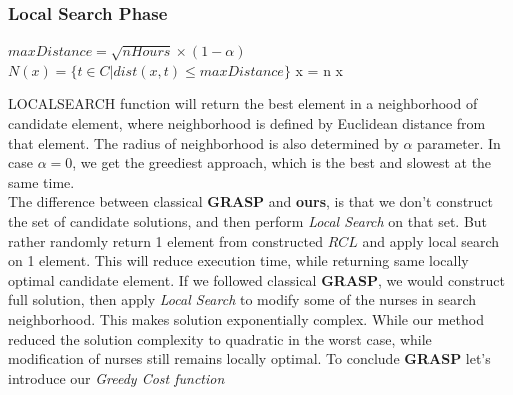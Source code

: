 \documentclass{article}
\newcommand\tab[1][1cm]{\hspace*{#1}}
\begin{document}
	\subsubsection{Local Search Phase}
	\begin{algorithmic}[1]
		\State $maxDistance = \sqrt{nHours} \times (1-\alpha)$
		\State $N(x) = \{t \in C | dist(x,t) \leq maxDistance \}$
				\State x = n
			\EndIf
		\EndFor
		\State \Return x
	\EndFunction
	\end{algorithmic}
\tab LOCALSEARCH function will return the best element in a neighborhood of candidate element, where neighborhood is defined by Euclidean distance from that element. The radius of neighborhood is also determined by $\alpha$ parameter. In case $\alpha = 0$, we get the greediest approach, which is the best and slowest at the same time.\\
\tab The difference between classical \textbf{GRASP} and \textbf{ours}, is that we don't construct the set of candidate solutions, and then perform \textit{Local Search} on that set. But rather randomly return 1 element from constructed $RCL$ and apply local search on 1 element. This will reduce execution time, while returning same locally optimal candidate element. If we followed classical \textbf{GRASP}, we would construct full solution, then apply \textit{Local Search} to modify some of the nurses in search neighborhood. This makes solution exponentially complex. While our method reduced the solution complexity to quadratic in the worst case, while modification of nurses still remains locally optimal. To conclude \textbf{GRASP} let's introduce our \textit{Greedy Cost function}
\end{document}
